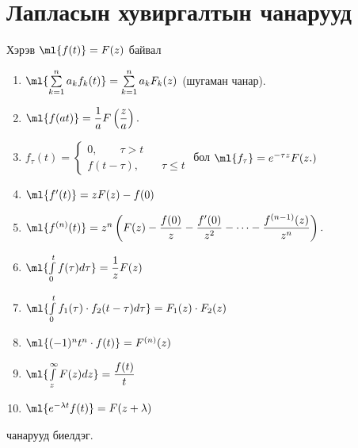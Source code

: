 \section{Лапласын хувиргалтын чанарууд} 
Хэрэв $\ml{f(t)}=F(z)$ байвал 
\begin{enumerate}
    \item $\ml{\sum\limits_{k=1}^n a_k f_k(t)}=\sum\limits_{k=1}^n a_kF_k (z)$ (шугаман чанар). 
    \item $\ml{f(at)}=\dfrac{1}{a}F\left(\dfrac{z}{a}\right).$
    \item $f_\tau (t) = \begin{cases}
     0, \qquad \tau >t \\
     f(t-\tau), \qquad \tau \leq t
    \end{cases}$ бол $\ml{f_\tau}=e^{-\tau z}F(z.)$
    \item $\ml{f'(t)}=zF(z)-f(0)$
    \item $\ml{f^{(n)}(t)}=z^n\left(F(z)-\dfrac{f(0)}{z}-\dfrac{f'(0)}{z^2}-\cdots -\dfrac{f^{(n-1)}(z)}{z^n}\right).$
    \item $\ml{\int\limits_0^t f(\tau)d\tau}=\dfrac{1}{z}F(z)$
    \item $\ml{\int\limits_{0}^t f_1(\tau) \cdot f_2(t-\tau)d\tau}= F_1(z)\cdot F_2(z)$
    \item $\ml{(-1)^nt^n\cdot f(t)} = F^{(n)}(z)$
    \item $\ml{\int\limits_{z}^\infty F(z)dz}=\dfrac{f(t)}{t}$
    \item $\ml{e^{-\lambda t}f(t)}=F(z+\lambda)$
\end{enumerate}
чанарууд биелдэг.

